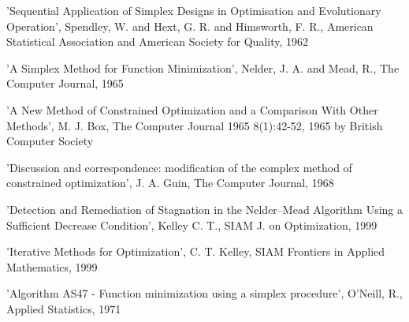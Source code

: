 \begin{References}\relax
'Sequential Application of Simplex Designs in Optimisation and Evolutionary
Operation', Spendley, W. and Hext, G. R. and Himsworth, F. R., American
Statistical Association and American Society for Quality, 1962

'A Simplex Method for Function Minimization', Nelder, J. A. and Mead, R., The
Computer Journal, 1965

'A New Method of Constrained Optimization and a Comparison With Other Methods',
M. J. Box, The Computer Journal 1965 8(1):42-52, 1965 by British Computer
Society

'Discussion and correspondence: modification of the complex method of
constrained optimization', J. A. Guin, The Computer Journal, 1968

'Detection and Remediation of Stagnation in the Nelder--Mead Algorithm Using a
Sufficient Decrease Condition', Kelley C. T., SIAM J. on Optimization, 1999

'Iterative Methods for Optimization', C. T. Kelley, SIAM Frontiers in Applied
Mathematics, 1999

'Algorithm AS47 - Function minimization using a simplex procedure', O'Neill, R.,
Applied Statistics, 1971
\end{References}
%
\begin{SeeAlso}\relax
{}
\end{SeeAlso}
